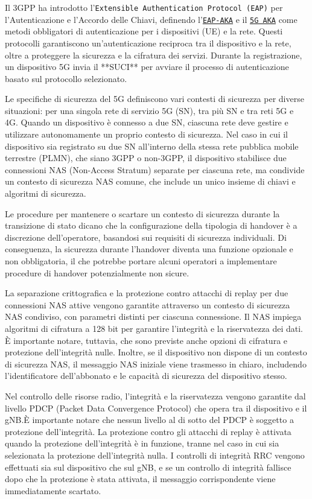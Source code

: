 \documentclass[english]{article}
\begin{document}
Il 3GPP ha introdotto l'\texttt{Extensible Authentication Protocol (EAP)} per
l'Autenticazione e l'Accordo delle Chiavi, definendo
l'\texttt{\hyperlink{EAP-AKA}{EAP-AKA}} e il \texttt{\hyperlink{5G AKA}{5G
		AKA}} come metodi obbligatori di autenticazione per i dispositivi (UE) e la
rete. Questi protocolli garantiscono un'autenticazione reciproca tra il
dispositivo e la rete, oltre a proteggere la sicurezza e la cifratura dei
servizi. Durante la registrazione, un dispositivo 5G invia il **SUCI** per
avviare il processo di autenticazione basato sul protocollo selezionato.

Le specifiche di sicurezza del 5G definiscono vari contesti di sicurezza per
diverse situazioni: per una singola rete di servizio 5G (SN), tra più SN e tra
reti 5G e 4G. Quando un dispositivo è connesso a due SN, ciascuna rete deve
gestire e utilizzare autonomamente un proprio contesto di sicurezza. Nel caso
in cui il dispositivo sia registrato su due SN all'interno della stessa rete
pubblica mobile terrestre (PLMN), che siano 3GPP o non-3GPP, il dispositivo
stabilisce due connessioni NAS (Non-Access Stratum) separate per ciascuna rete,
ma condivide un contesto di sicurezza NAS comune, che include un unico insieme
di chiavi e algoritmi di sicurezza.

Le procedure per mantenere o scartare un contesto di sicurezza durante la
transizione di stato dicano che la configurazione della tipologia di handover è
a discrezione dell'operatore, basandosi sui requisiti di sicurezza individuali.
Di conseguenza, la sicurezza durante l'handover diventa una funzione opzionale
e non obbligatoria, il che potrebbe portare alcuni operatori a implementare
procedure di handover potenzialmente non sicure.

La separazione crittografica e la protezione contro attacchi di replay per due
connessioni NAS attive vengono garantite attraverso un contesto di sicurezza
NAS condiviso, con parametri distinti per ciascuna connessione. Il NAS impiega
algoritmi di cifratura a 128 bit per garantire l'integrità e la riservatezza
dei dati. È importante notare, tuttavia, che sono previste anche opzioni di
cifratura e protezione dell'integrità nulle. Inoltre, se il dispositivo non
dispone di un contesto di sicurezza NAS, il messaggio NAS iniziale viene
trasmesso in chiaro, includendo l'identificatore dell'abbonato e le capacità di
sicurezza del dispositivo stesso.

Nel controllo delle risorse radio, l'integrità e la riservatezza vengono
garantite dal livello PDCP (Packet Data Convergence Protocol) che opera tra il
dispositivo e il gNB.\@ È importante notare che nessun livello al di sotto del
PDCP è soggetto a protezione dell'integrità. La protezione contro gli attacchi
di replay è attivata quando la protezione dell'integrità è in funzione, tranne
nel caso in cui sia selezionata la protezione dell'integrità nulla. I controlli
di integrità RRC vengono effettuati sia sul dispositivo che sul gNB, e se un
controllo di integrità fallisce dopo che la protezione è stata attivata, il
messaggio corrispondente viene immediatamente scartato.
\end{document}
